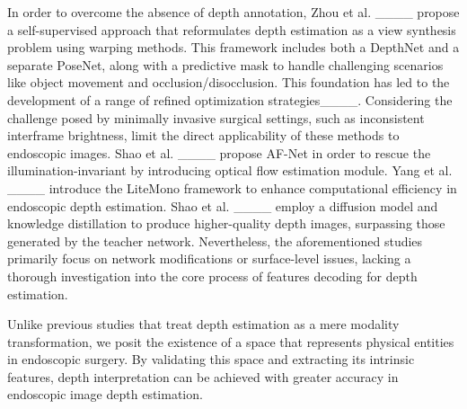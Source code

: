 In order to overcome the absence of depth annotation, Zhou et al. ____ propose a self-supervised approach that reformulates depth estimation as a view synthesis problem using warping methods. This framework includes both a DepthNet and a separate PoseNet, along with a predictive mask to handle challenging scenarios like object movement and occlusion/disocclusion. This foundation has led to the development of a range of refined optimization strategies____.  Considering the challenge posed by minimally invasive surgical settings, such as inconsistent interframe brightness, limit the direct applicability of these methods to endoscopic images. Shao et al. ____ propose AF-Net in order to rescue the illumination-invariant by introducing optical flow estimation module. Yang et al. ____ introduce the LiteMono framework to enhance computational efficiency in endoscopic depth estimation. Shao et al. ____ employ a diffusion model and knowledge distillation to produce higher-quality depth images, surpassing those generated by the teacher network. Nevertheless, the aforementioned studies primarily focus on network modifications or surface-level issues, lacking a thorough investigation into the core process of features decoding for depth estimation.\par 

Unlike previous studies that treat depth estimation as a mere modality transformation, we posit the existence of a space that represents physical entities in endoscopic surgery. By validating this space and extracting its intrinsic features, depth interpretation can be achieved with greater accuracy in endoscopic image depth estimation.\par